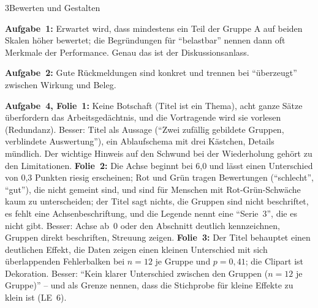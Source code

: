 \begin{uebungsblattb}{3}{Bewerten und Gestalten}
\begin{lehrhinweis}[Erwartungshorizont]
\textbf{Aufgabe~1:} Erwartet wird, dass mindestens ein Teil der Gruppe A
auf beiden Skalen höher bewertet; die Begründungen für
\enquote{belastbar} nennen dann oft Merkmale der Performance. Genau das ist
der Diskussionsanlass.

\textbf{Aufgabe~2:} Gute Rückmeldungen sind konkret und trennen bei
\enquote{überzeugt} zwischen Wirkung und Beleg.

\textbf{Aufgabe~4, Folie~1:} Keine Botschaft (Titel ist ein Thema),
acht ganze Sätze überfordern das Arbeitsgedächtnis, und die Vortragende
wird sie vorlesen (Redundanz). Besser: Titel als Aussage (\enquote{Zwei
zufällig gebildete Gruppen, verblindete Auswertung}), ein Ablaufschema mit
drei Kästchen, Details mündlich. Der wichtige Hinweis auf den Schwund bei
der Wiederholung gehört zu den Limitationen. \textbf{Folie~2:} Die
Achse beginnt bei 6,0 und lässt einen Unterschied von 0,3 Punkten riesig
erscheinen; Rot und Grün tragen Bewertungen
(\enquote{schlecht}, \enquote{gut}), die nicht gemeint sind, und sind für
Menschen mit Rot-Grün-Schwäche kaum zu unterscheiden; der Titel sagt
nichts, die Gruppen sind nicht beschriftet, es fehlt eine Achsenbeschriftung, und die Legende
nennt eine \enquote{Serie~3}, die es nicht gibt. Besser: Achse ab~0 oder
den Abschnitt deutlich kennzeichnen, Gruppen direkt beschriften, Streuung
zeigen. \textbf{Folie~3:} Der Titel behauptet einen deutlichen Effekt, die
Daten zeigen einen kleinen Unterschied mit sich überlappenden
Fehlerbalken bei $n = 12$ je Gruppe und $p = 0{,}41$; die Clipart ist
Dekoration. Besser: \enquote{Kein klarer Unterschied zwischen den Gruppen
($n = 12$ je Gruppe)} -- und als Grenze nennen, dass die Stichprobe für
kleine Effekte zu klein ist (LE~6).
\end{lehrhinweis}
\end{uebungsblattb}
